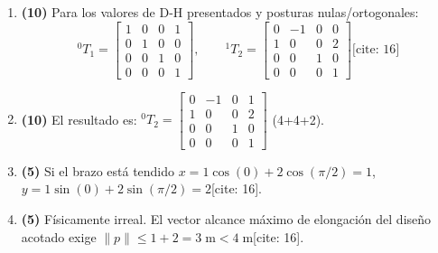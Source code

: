 \documentclass[11pt, a4paper]{article}
\begin{document}
\begin{enumerate}\footnotesize
    \item \textbf{(10)} Para los valores de D-H presentados y posturas nulas/ortogonales:
    \begin{equation*}
        {}^0T_1 = \begin{bmatrix} 1 & 0 & 0 & 1 \\ 0 & 1 & 0 & 0 \\ 0 & 0 & 1 & 0 \\ 0 & 0 & 0 & 1 \end{bmatrix}, \qquad {}^1T_2 = \begin{bmatrix} 0 & -1 & 0 & 0 \\ 1 & 0 & 0 & 2 \\ 0 & 0 & 1 & 0 \\ 0 & 0 & 0 & 1 \end{bmatrix} \text{[cite: 16]}
    \end{equation*}
    \item \textbf{(10)} El resultado es: ${}^0T_2 = \begin{bmatrix} 0 & -1 & 0 & 1 \\ 1 & 0 & 0 & 2 \\ 0 & 0 & 1 & 0 \\ 0 & 0 & 0 & 1 \end{bmatrix}$ (4+4+2).
    \item \textbf{(5)} Si el brazo está tendido $x = 1\cos(0) + 2\cos(\pi/2) = 1$, $y = 1\sin(0) + 2\sin(\pi/2) = 2$[cite: 16].
    \item \textbf{(5)} Físicamente irreal. El vector alcance máximo de elongación del diseño acotado exige $\|p\| \le 1 + 2 = 3\;\mathrm{m} < 4\;\mathrm{m}$[cite: 16].
\end{enumerate}
\end{document}
